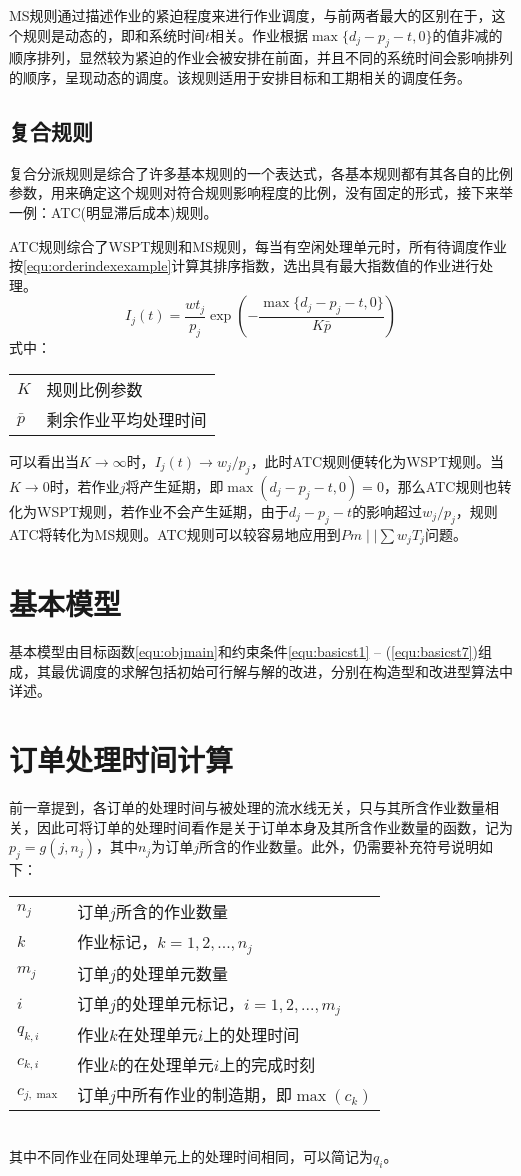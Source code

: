 MS规则通过描述作业的紧迫程度来进行作业调度，与前两者最大的区别在于，这个规则是动态的，即和系统时间$t$相关。作业根据$\max \{d_j - p_j - t , 0\}$的值非减的顺序排列，显然较为紧迫的作业会被安排在前面，并且不同的系统时间会影响排列的顺序，呈现动态的调度。该规则适用于安排目标和工期相关的调度任务。
\subsection{复合规则}
复合分派规则是综合了许多基本规则的一个表达式，各基本规则都有其各自的比例参数，用来确定这个规则对符合规则影响程度的比例，没有固定的形式，接下来举一例：ATC(明显滞后成本)规则。

ATC规则综合了WSPT规则和MS规则，每当有空闲处理单元时，所有待调度作业按\eqref{equ:orderindexexample}计算其排序指数，选出具有最大指数值的作业进行处理。
\begin{equation}
I_j(t) = \frac{wt_j}{p_j}\exp\left(-\frac{\max\{d_j - p_j - t, 0\}}{K\bar p}\right) \label{equ:orderindexexample}
\end{equation}
式中：

\begin{tabular}{ll}
$K$ & 规则比例参数\\
$\bar p$ &剩余作业平均处理时间
\end{tabular}

可以看出当$K \to \infty$时，$I_j(t) \to w_j/p_j$，此时ATC规则便转化为WSPT规则。当$K \to 0$时，若作业$j$将产生延期，即$\max(d_j - p_j -t , 0 ) = 0$，那么ATC规则也转化为WSPT规则，若作业不会产生延期，由于$d_j - p_j - t$的影响超过$w_j/p_j$，规则ATC将转化为MS规则。ATC规则可以较容易地应用到$Pm\mid\mid \sum w_jT_j$问题。

\section{基本模型}
基本模型由目标函数\eqref{equ:objmain}和约束条件\eqref{equ:basicst1} -- (\ref{equ:basicst7})组成，其最优调度的求解包括初始可行解与解的改进，分别在构造型和改进型算法中详述。
\section{订单处理时间计算}
前一章提到，各订单的处理时间与被处理的流水线无关，只与其所含作业数量相关，因此可将订单的处理时间看作是关于订单本身及其所含作业数量的函数，记为$p_j = g(j,n_j)$，其中$n_j$为订单$j$所含的作业数量。此外，仍需要补充符号说明如下：\\[3pt]
\begin{supertabular}{ll}
$n_j$ & 订单$j$所含的作业数量\\
$k$ & 作业标记，$k = 1,2,...,n_j$\\
$m_j$ & 订单$j$的处理单元数量\\
$i$ & 订单$j$的处理单元标记，$i = 1,2,...,m_j$\\
$q_{k,i}$ & 作业$k$在处理单元$i$上的处理时间\\
$c_{k,i}$ &作业$k$的在处理单元$i$上的完成时刻\\
$c_{j,\max}$ & 订单$j$中所有作业的制造期，即$\max(c_k)$\\
\end{supertabular}\\[3pt]
其中不同作业在同处理单元上的处理时间相同，可以简记为$q_i$。

